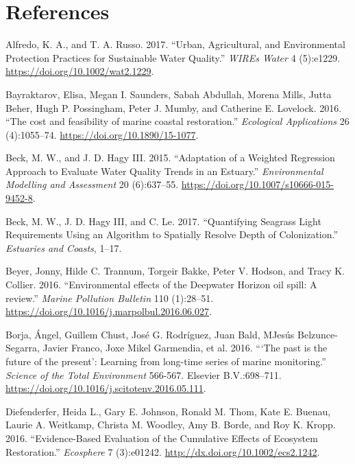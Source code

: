 \documentclass[]{article}
\begin{document}
\hypertarget{references}{%
\section*{References}\label{references}}

\hypertarget{refs}{}
\leavevmode\hypertarget{ref-Alfredo17}{}%
Alfredo, K. A., and T. A. Russo. 2017. ``Urban, Agricultural, and
Environmental Protection Practices for Sustainable Water Quality.''
\emph{WIREs Water} 4 (5):e1229. \url{https://doi.org/10.1002/wat2.1229}.

\leavevmode\hypertarget{ref-Bayraktarov16}{}%
Bayraktarov, Elisa, Megan I. Saunders, Sabah Abdullah, Morena Mills,
Jutta Beher, Hugh P. Possingham, Peter J. Mumby, and Catherine E.
Lovelock. 2016. ``The cost and feasibility of marine coastal
restoration.'' \emph{Ecological Applications} 26 (4):1055--74.
\url{https://doi.org/10.1890/15-1077}.

\leavevmode\hypertarget{ref-Beck15}{}%
Beck, M. W., and J. D. Hagy III. 2015. ``Adaptation of a Weighted
Regression Approach to Evaluate Water Quality Trends in an Estuary.''
\emph{Environmental Modelling and Assessment} 20 (6):637--55.
\url{https://doi.org/10.1007/s10666-015-9452-8}.

\leavevmode\hypertarget{ref-Beck17c}{}%
Beck, M. W., J. D. Hagy III, and C. Le. 2017. ``Quantifying Seagrass
Light Requirements Using an Algorithm to Spatially Resolve Depth of
Colonization.'' \emph{Estuaries and Coasts}, 1--17.

\leavevmode\hypertarget{ref-Beyer16}{}%
Beyer, Jonny, Hilde C. Trannum, Torgeir Bakke, Peter V. Hodson, and
Tracy K. Collier. 2016. ``Environmental effects of the Deepwater Horizon
oil spill: A review.'' \emph{Marine Pollution Bulletin} 110 (1):28--51.
\url{https://doi.org/10.1016/j.marpolbul.2016.06.027}.

\leavevmode\hypertarget{ref-Borja16}{}%
Borja, Ángel, Guillem Chust, José G. Rodríguez, Juan Bald,
M\textordfeminine Jesús Belzunce-Segarra, Javier Franco, Joxe Mikel
Garmendia, et al. 2016. ```The past is the future of the present':
Learning from long-time series of marine monitoring.'' \emph{Science of
the Total Environment} 566-567. Elsevier B.V.:698--711.
\url{https://doi.org/10.1016/j.scitotenv.2016.05.111}.

\leavevmode\hypertarget{ref-Diefenderfer16}{}%
Diefenderfer, Heida L., Gary E. Johnson, Ronald M. Thom, Kate E. Buenau,
Laurie A. Weitkamp, Christa M. Woodley, Amy B. Borde, and Roy K. Kropp.
2016. ``Evidence-Based Evaluation of the Cumulative Effects of Ecosystem
Restoration.'' \emph{Ecosphere} 7 (3):e01242.
\url{http://dx.doi.org/10.1002/ecs2.1242}.
\end{document}

